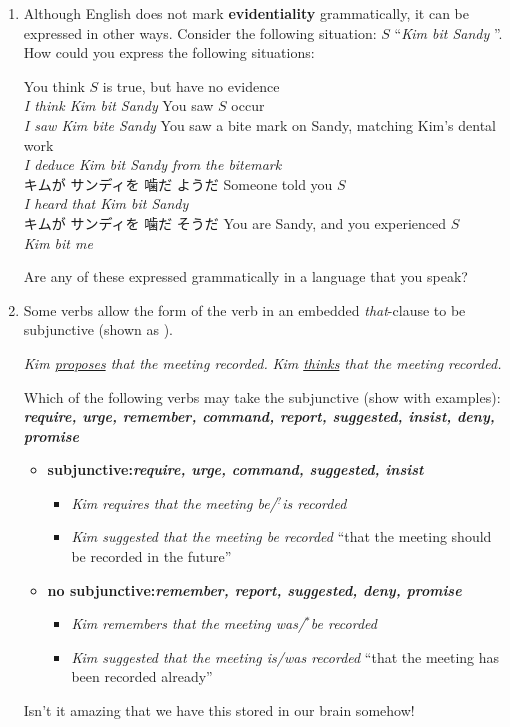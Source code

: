 \documentclass[a4paper]{article}
\newcommand{\lex}[1]{\textbf{\textit{#1}}}
\newcommand{\eng}[1]{\textit{#1}}
\newcommand{\ix}{\ex\it}
\newcommand{\ul}[1]{\uline{#1}}
\newcommand{\ull}{\uuline}
\begin{document}
\begin{enumerate}
\item Although English does not mark \textbf{evidentiality} grammatically, it
  can be expressed in other ways.  Consider the following situation:
$S$ ``\eng{Kim bit Sandy} ''.  How could you express the following situations:
  \begin{exe}
    \ex You think $S$ is true, but have no evidence
    \\ \eng{I think Kim bit Sandy}
    \ex You saw $S$ occur
    \\ \eng{I saw Kim bite Sandy}
    \ex You saw a bite mark on Sandy, matching Kim's dental work
    \\ \eng{I deduce Kim bit Sandy from the bitemark}
    \\ キムが サンディを 噛だ ようだ 
    \ex Someone told you $S$
    \\ \eng{I heard that Kim bit Sandy}
    \\ キムが サンディを 噛だ そうだ 
    \ex You are Sandy, and you experienced $S$ 
    \\ \eng{Kim bit me}
  \end{exe}
  Are any of these expressed grammatically in a language that you
  speak? 

  \newpage
\item Some verbs allow the form of the verb in an embedded
  \textit{that}-clause to be subjunctive (shown as \ull{subjunctive form}).
  \begin{exe}
  \ex \textit{Kim \ul{proposes} that the meeting \ull{be} recorded.}
  \ex *\textit{Kim \ul{thinks} that the meeting \ull{be} recorded.}
  \end{exe}
  Which of the following verbs may take the subjunctive (show with
  examples): \\ \lex{require, urge, remember, command, report,
    suggested, insist, deny, promise}
  \begin{itemize}
  \item \textbf{subjunctive:}\lex{require, urge, command, 
      suggested, insist}
     \begin{itemize}
     \item \eng{Kim requires that the meeting be/$^?$is recorded}
        \item \eng{Kim suggested that the meeting be recorded}
      ``that the meeting should be recorded in the future''
    \end{itemize}
  \item \textbf{no subjunctive:}\lex{remember, report,
    suggested,   deny, promise}
    \begin{itemize}
    \item \eng{Kim remembers that the meeting was/$^*$be recorded}
    \item \eng{Kim suggested that the meeting is/was recorded}
      ``that the meeting has been recorded already''
    \end{itemize}
  \end{itemize}
  Isn't it amazing that we have this stored in our brain somehow!



\end{enumerate}
\end{document}
